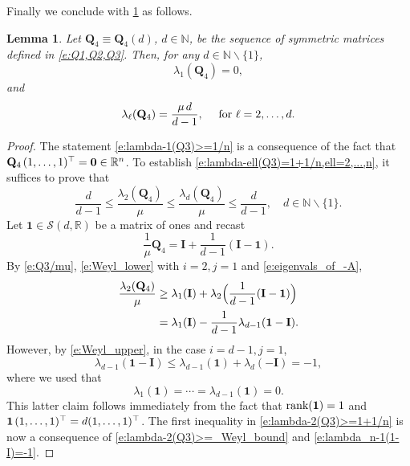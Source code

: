 \documentclass[9pt,twocolumn,twoside]{pnas-new}
\newcommand{\bbR}{{\mathbb R}}
\newcommand{\bbN}{{\mathbb N}}
\newcommand{\?}{\textbf{?}}
\newcommand{\GD}[1]{#1}
\newcommand{\QQ}{\mathbf{Q}}
\newcommand{\II}{\mathbf{I}}
\newtheorem{lemma}{\bf Lemma}
\begin{document}
Finally we conclude with \cref{l:lambda-2(Q3)>=1+1/n} as follows.
\begin{lemma}\label{l:lambda-2(Q3)>=1+1/n}
  Let $\QQ_4 \equiv \QQ_4(d)$, $d \in \bbN$, be the sequence of
  symmetric matrices defined in \eqref{e:Q1,Q2,Q3}. Then, for any
  $d \in \bbN \backslash\{1\}$,
\begin{equation}\label{e:lambda-1(Q3)>=1/n}
  \lambda_1(\QQ_4) = 0,
\end{equation}
and
\begin{equation}\label{e:lambda-ell(Q3)=1+1/n,ell=2,...,n}
  \lambda_\ell(\QQ_4) = \GD{\frac{\mu \hspace{0.5mm} d}{d-1} }, \quad
  \text{ for } \ell = 2,\hdots,d.
\end{equation}
\end{lemma}
\begin{proof}
  The statement \eqref{e:lambda-1(Q3)>=1/n} is a consequence of the
  fact that
  $\QQ_4 \hspace{0.5mm}(1,\hdots,1)^\top = {\mathbf 0} \in \bbR^n$. To
  establish \eqref{e:lambda-ell(Q3)=1+1/n,ell=2,...,n}, it suffices to
  prove that
\begin{equation}\label{e:lambda-2(Q3)>=1+1/n}
  \frac{d}{d-1} \leq \GD{\frac{\lambda_2(\QQ_4)}{\mu}
    \leq \frac{\lambda_d(\QQ_4)}{\mu}} \leq \frac{d}{d-1},
  \quad d \in \bbN \backslash\{1\}.
\end{equation}
Let ${\mathbf 1} \in {\mathcal S}(d,\bbR)$ be a matrix of
ones and recast
\begin{equation}\label{e:Q3/mu}
\frac{1}{\mu}\QQ_4 = \II + \frac{1}{d-1}(\II-{\mathbf 1}). 
\end{equation}
By \eqref{e:Q3/mu}, \eqref{e:Weyl_lower} with $i = 2, j=1$
and \eqref{e:eigenvals_of_-A},
\begin{align}
  \frac{\lambda_2(\QQ_4)}{\mu}
  &\geq \lambda_{1}(\II) + \lambda_{2}\Big(\frac{1}{d-1}(\II-{\mathbf 1})\Big)
    \notag\\
  &= \lambda_{1}(\II) - \frac{1}{d-1}\lambda_{d-1}({\mathbf 1}-\II).
    \label{e:lambda-2(Q3)>=_Weyl_bound}
\end{align}
However, by \eqref{e:Weyl_upper}, in the case $i = d-1, j = 1$,
\begin{equation}\label{e:lambda_n-1(1-I)=-1}
  \lambda_{d-1}({\mathbf 1}-\II)
  \leq \lambda_{d-1}({\mathbf 1}) + \lambda_d(-\II) = -1,
\end{equation}
where we used that
\begin{equation}\label{e:rank(1)=1}
  \lambda_{1}(\mathbf{1}) = \cdots = \lambda_{d-1}({\mathbf 1}) = 0.
\end{equation}
This latter claim follows immediately from the fact that
$\textnormal{rank}({\mathbf 1}) = 1$ and
$\mathbf{1} \hspace{0.5mm}(1,\hdots,1)^\top= d(1,\hdots,1)^\top$.  The
first inequality in \eqref{e:lambda-2(Q3)>=1+1/n} is now a consequence
of \eqref{e:lambda-2(Q3)>=_Weyl_bound} and
\eqref{e:lambda_n-1(1-I)=-1}.


\end{proof}
\end{document}

